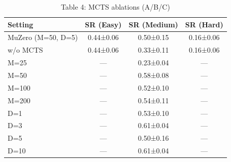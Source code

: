 \begin{table}[htbp]
\centering
\caption{Table 4: MCTS ablations (A/B/C)}
\begin{tabular}{lccc}
\toprule
Setting & SR (Easy) & SR (Medium) & SR (Hard) \\
\midrule
MuZero (M=50, D=5) & 0.44±0.06 & 0.50±0.15 & 0.16±0.06 \\
w/o MCTS & 0.44±0.06 & 0.33±0.11 & 0.16±0.06 \\
M=25 & — & 0.23±0.04 & — \\
M=50 & — & 0.58±0.08 & — \\
M=100 & — & 0.52±0.10 & — \\
M=200 & — & 0.54±0.11 & — \\
D=1 & — & 0.53±0.10 & — \\
D=3 & — & 0.61±0.04 & — \\
D=5 & — & 0.50±0.16 & — \\
D=10 & — & 0.61±0.04 & — \\
\bottomrule
\end{tabular}
\end{table}

